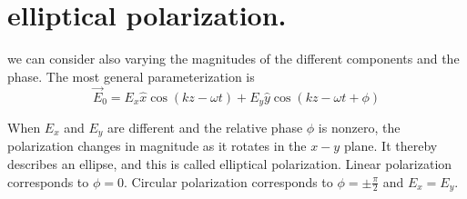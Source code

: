 \section{elliptical polarization.}
 we can consider also varying the magnitudes of the different components and the phase. The most general parameterization is
 $$\vec{E}_{0}=E_{x} \hat{x} \cos (k z-\omega t)+E_{y} \hat{y} \cos (k z-\omega t+\phi)$$

 When $E_{x}$ and $E_{y}$ are different and the relative phase $\phi$ is nonzero, the polarization changes in magnitude as it rotates in the $x-y$ plane. It thereby describes an ellipse, and this is called elliptical polarization. Linear polarization corresponds to $\phi=0$. Circular polarization corresponds to $\phi=\pm \frac{\pi}{2}$ and $E_{x}=E_{y}$.
 
 
 
 
 
 
 
 
 
 
 
 
 
 
 
 
 
 
 
 
 
 
 
 
 
 
 
 
 
 
 
 
 
 
 
 
 
 
 
 
 
 
 
 
 
 
 
 
 
 
 
 
 
 
 
 
 
 
 
 
 
 
 
 
 
